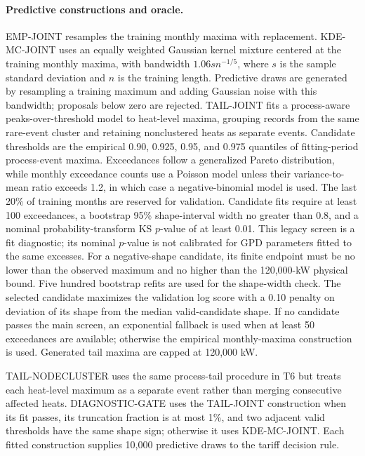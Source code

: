 \documentclass[]{interact}
\begin{document}
\paragraph*{Predictive constructions and oracle.}
EMP-JOINT resamples the training monthly maxima with replacement.
KDE-MC-JOINT uses an equally weighted Gaussian kernel mixture centered
at the training monthly maxima, with bandwidth $1.06s n^{-1/5}$, where
$s$ is the sample standard deviation and $n$ is the training length.
Predictive draws are generated by resampling a training maximum and
adding Gaussian noise with this bandwidth; proposals below zero are
rejected. TAIL-JOINT fits a process-aware peaks-over-threshold
model to heat-level maxima, grouping records from the same rare-event
cluster and retaining nonclustered heats as separate events. Candidate
thresholds are the empirical 0.90, 0.925, 0.95, and 0.975 quantiles of fitting-period process-event maxima.
Exceedances follow a generalized Pareto distribution, while monthly
exceedance counts use a Poisson model unless their variance-to-mean
ratio exceeds 1.2, in which case a negative-binomial model is used.
The last 20\% of training months are reserved for validation. Candidate
fits require at least 100 exceedances, a bootstrap 95\% shape-interval
width no greater than 0.8, and a nominal probability-transform KS $p$-value of at least 0.01.
This legacy screen is a fit diagnostic; its nominal $p$-value
is not calibrated for GPD parameters fitted to the same excesses. For a negative-shape candidate, its finite endpoint must
be no lower than the observed maximum and no higher than the
120,000-kW physical bound. Five hundred bootstrap refits are used for
the shape-width check. The selected candidate maximizes the
validation log score with a 0.10 penalty on deviation of its shape
from the median valid-candidate shape. If no candidate passes the main
screen, an exponential fallback is used when at least 50 exceedances
are available; otherwise the empirical monthly-maxima construction is
used. Generated tail maxima are capped at 120,000 kW.

TAIL-NODECLUSTER uses the same process-tail procedure in T6 but treats
each heat-level maximum as a separate event rather than merging
consecutive affected heats. DIAGNOSTIC-GATE uses the TAIL-JOINT
construction when its fit passes, its truncation fraction is at most
1\%, and two adjacent valid thresholds have the same shape sign;
otherwise it uses KDE-MC-JOINT. Each fitted construction supplies
10,000 predictive draws to the tariff decision rule.
\end{document}
